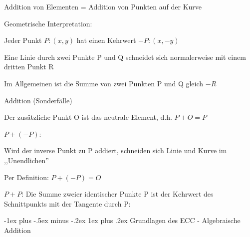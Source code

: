 \documentclass[a4paper]{article}
\makeatletter
\renewcommand{\subsubsection}{\@startsection{subsubsection}{3}{0mm}%
 {-1ex plus -.5ex minus -.2ex}%
 {1ex plus .2ex}%
 {\normalfont\small\bfseries}}
\makeatother
\begin{document}
\begin{multicols}{3}
      \begin{itemize*}
            \item Addition von Elementen = Addition von Punkten auf der Kurve
            \item Geometrische Interpretation:
            \begin{itemize*}
                  \item Jeder Punkt $P:(x,y)$ hat einen Kehrwert $-P:(x,-y)$
                  \item Eine Linie durch zwei Punkte P und Q schneidet sich normalerweise mit einem dritten Punkt R
                  \item Im Allgemeinen ist die Summe von zwei Punkten P und Q gleich $-R$
            \end{itemize*}
            \item Addition (Sonderfälle)
            \begin{itemize*}
                  \item Der zusätzliche Punkt O ist das neutrale Element, d.h. $P+O=P$
                  \item $P + (-P)$:
                  \begin{itemize*} \item Wird der inverse Punkt zu P addiert, schneiden sich Linie und Kurve im ,,Unendlichen'' \item Per Definition: $P+(-P) = O$ \end{itemize*}
                  \item $P+P$: Die Summe zweier identischer Punkte P ist der Kehrwert des Schnittpunkts mit der Tangente durch P:
            \end{itemize*}
      \end{itemize*}


      \subsubsection{Grundlagen des ECC - Algebraische
            Addition}


\end{multicols}
\end{document}
